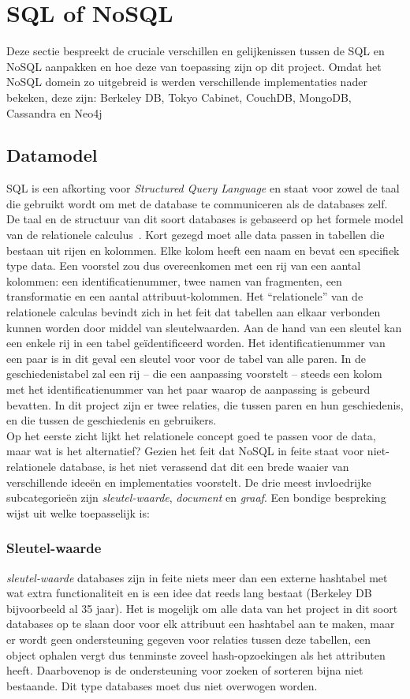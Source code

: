 \section{SQL of NoSQL}
Deze sectie bespreekt de cruciale verschillen en gelijkenissen tussen de SQL en NoSQL aanpakken en hoe deze van toepassing zijn op dit project. Omdat het NoSQL domein zo uitgebreid is werden verschillende implementaties nader bekeken, deze zijn: Berkeley DB, Tokyo Cabinet, CouchDB, MongoDB, Cassandra en Neo4j

\subsection{Datamodel}
SQL is een afkorting voor \emph{Structured Query Language} en staat voor zowel de taal die gebruikt wordt om met de database te communiceren als de databases zelf. De taal en de structuur van dit soort databases is gebaseerd op het formele model van de relationele calculus~\cite{Codd90}. Kort gezegd moet alle data passen in tabellen die bestaan uit rijen en kolommen. Elke kolom heeft een naam en bevat een specifiek type data. Een voorstel zou dus overeenkomen met een rij van een aantal kolommen: een identificatienummer, twee namen van fragmenten, een transformatie en een aantal attribuut-kolommen. Het ``relationele'' van de relationele calculas bevindt zich in het feit dat tabellen aan elkaar verbonden kunnen worden door middel van sleutelwaarden. Aan de hand van een sleutel kan een enkele rij in een tabel ge\"identificeerd worden. Het identificatienummer van een paar is in dit geval een sleutel voor voor de tabel van alle paren. In de geschiedenistabel zal een rij -- die een aanpassing voorstelt -- steeds een kolom met het identificatienummer van het paar waarop de aanpassing is gebeurd bevatten. In dit project zijn er twee relaties, die tussen paren en hun geschiedenis, en die tussen de geschiedenis en gebruikers.\\ 

Op het eerste zicht lijkt het relationele concept goed te passen voor de data, maar wat is het alternatief? Gezien het feit dat NoSQL in feite staat voor niet-relationele database, is het niet verassend dat dit een brede waaier van verschillende idee\"en en implementaties voorstelt. De drie meest invloedrijke subcategorie\"en zijn \emph{sleutel-waarde}, \emph{document} en \emph{graaf}. Een bondige bespreking wijst uit welke toepasselijk is:

\subsubsection{Sleutel-waarde}
\emph{sleutel-waarde} databases zijn in feite niets meer dan een externe hashtabel met wat extra functionaliteit en is een idee dat reeds lang bestaat (Berkeley DB bijvoorbeeld al 35 jaar). Het is mogelijk om alle data van het project in dit soort databases op te slaan door voor elk attribuut een hashtabel aan te maken, maar er wordt geen ondersteuning gegeven voor relaties tussen deze tabellen, een object ophalen vergt dus tenminste zoveel hash-opzoekingen als het attributen heeft. Daarbovenop is de ondersteuning voor zoeken of sorteren bijna niet bestaande. Dit type databases moet dus niet overwogen worden.

